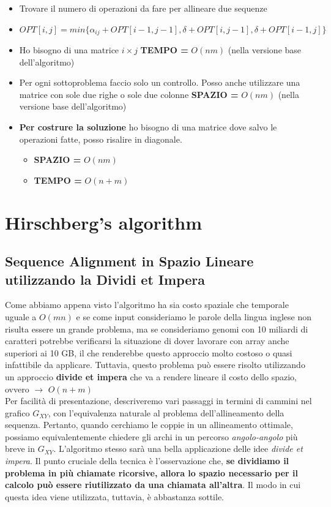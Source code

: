 \begin{itemize}
	\item
	      Trovare il numero di operazioni da fare per allineare due sequenze
	\item
	      $OPT[i,j] = min\{ \alpha_{ij} + OPT[i-1,j-1], \delta + OPT[i, j-1], \delta + OPT[i-1, j] \}$
	\item
	      Ho bisogno di una matrice $i \times j$ \textbf{TEMPO =} $O(nm)$
	      (nella versione base dell'algoritmo)
	\item
	      Per ogni sottoproblema faccio solo un controllo. Posso anche
	      utilizzare una matrice con sole due righe o sole due colonne
	      \textbf{SPAZIO =} $O(nm)$ (nella versione base dell'algoritmo)
	\item
	      \textbf{Per costrure la soluzione} ho bisogno di una matrice dove
	      salvo le operazioni fatte, posso risalire in diagonale.

	      \begin{itemize}
		      \item
		            \textbf{SPAZIO =} $O(nm)$
		      \item
		            \textbf{TEMPO =} $O(n+m)$
	      \end{itemize}
\end{itemize}

\section{Hirschberg's algorithm}

\subsection{Sequence Alignment in Spazio Lineare utilizzando la Dividi et Impera}

Come abbiamo appena visto l'algoritmo ha sia costo spaziale che
temporale uguale a $O(mn)$ e se come input consideriamo le parole
della lingua inglese non risulta essere un grande problema, ma se
consideriamo genomi con 10 miliardi di caratteri potrebbe verificarsi la
situazione di dover lavorare con array anche superiori ai 10 GB, il che
renderebbe questo approccio molto costoso o quasi infattibile da
applicare. Tuttavia, questo problema può essere risolto utilizzando un
approccio \textbf{divide et impera} che va a rendere lineare il costo
dello spazio, ovvero $\rightarrow$ $O(n + m)$\\

Per facilità di presentazione, descriveremo vari passaggi in termini di
cammini nel grafico $G_{XY}$, con l'equivalenza naturale al problema
dell'allineamento della sequenza. Pertanto, quando cerchiamo le coppie
in un allineamento ottimale, possiamo equivalentemente chiedere gli
archi in un percorso \emph{angolo-angolo} più breve in $G_{XY}$.
L'algoritmo stesso sarà una bella applicazione delle idee \emph{divide
	et impera}. Il punto cruciale della tecnica è l'osservazione che,
\textbf{se dividiamo il problema in più chiamate ricorsive, allora lo
	spazio necessario per il calcolo può essere riutilizzato da una chiamata
	all'altra}. Il modo in cui questa idea viene utilizzata, tuttavia, è
abbastanza sottile.

